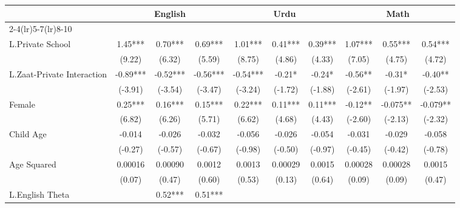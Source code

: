 \begin{sidewaystable}[htbp]\centering
\def\sym#1{\ifmmode^{#1}\else\(^{#1}\)\fi}
\caption{Scores at Class 4\label{wlags}}
\begin{tabular}{l*{9}{c}}
\toprule
                &\multicolumn{3}{c}{English}           &\multicolumn{3}{c}{Urdu}              &\multicolumn{3}{c}{Math}              \\\cmidrule(lr){2-4}\cmidrule(lr){5-7}\cmidrule(lr){8-10}
                &\multicolumn{1}{c}{}&\multicolumn{1}{c}{}&\multicolumn{1}{c}{}&\multicolumn{1}{c}{}&\multicolumn{1}{c}{}&\multicolumn{1}{c}{}&\multicolumn{1}{c}{}&\multicolumn{1}{c}{}&\multicolumn{1}{c}{}\\
\midrule
L.Private School&     1.45***&     0.70***&     0.69***&     1.01***&     0.41***&     0.39***&     1.07***&     0.55***&     0.54***\\
                &   (9.22)   &   (6.32)   &   (5.59)   &   (8.75)   &   (4.86)   &   (4.33)   &   (7.05)   &   (4.75)   &   (4.72)   \\
L.Zaat-Private Interaction&    -0.89***&    -0.52***&    -0.56***&    -0.54***&    -0.21*  &    -0.24*  &    -0.56** &    -0.31*  &    -0.40** \\
                &  (-3.91)   &  (-3.54)   &  (-3.47)   &  (-3.24)   &  (-1.72)   &  (-1.88)   &  (-2.61)   &  (-1.97)   &  (-2.53)   \\
Female          &     0.25***&     0.16***&     0.15***&     0.22***&     0.11***&     0.11***&    -0.12** &   -0.075** &   -0.079** \\
                &   (6.82)   &   (6.26)   &   (5.71)   &   (6.62)   &   (4.68)   &   (4.43)   &  (-2.60)   &  (-2.13)   &  (-2.32)   \\
Child Age       &   -0.014   &   -0.026   &   -0.032   &   -0.056   &   -0.026   &   -0.054   &   -0.031   &   -0.029   &   -0.058   \\
                &  (-0.27)   &  (-0.57)   &  (-0.67)   &  (-0.98)   &  (-0.50)   &  (-0.97)   &  (-0.45)   &  (-0.42)   &  (-0.78)   \\
Age Squared     &  0.00016   &  0.00090   &   0.0012   &   0.0013   &  0.00029   &   0.0015   &  0.00028   &  0.00028   &   0.0015   \\
                &   (0.07)   &   (0.47)   &   (0.60)   &   (0.53)   &   (0.13)   &   (0.64)   &   (0.09)   &   (0.09)   &   (0.47)   \\
L.English Theta &            &     0.52***&     0.51***&            &            &            &            &            &            \\

\end{tabular}
\end{sidewaystable}
